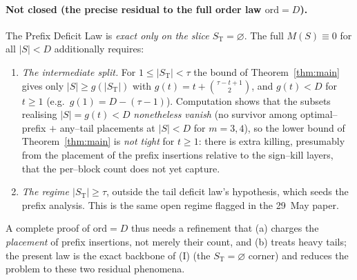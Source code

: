 \documentclass[11pt]{article}
\theoremstyle{definition}
\newcommand{\St}{S_{\mathrm T}}
\begin{document}
\paragraph{Not closed (the precise residual to the full order law $\mathrm{ord}=D$).}
The Prefix Deficit Law is \emph{exact only on the slice $\St=\varnothing$}. The full
$M(S)\equiv0$ for all $|S|<D$ additionally requires:
\begin{enumerate}[topsep=0.2em,itemsep=0.1em,label=\textup{(\Roman*)}]
\item \emph{The intermediate split.} For $1\le|\St|<\tau$ the bound of
Theorem~\ref{thm:main} gives only $|S|\ge g(|\St|)$ with
$g(t)=t+\binom{\tau-t+1}{2}$, and $g(t)<D$ for $t\ge1$ (e.g.\ $g(1)=D-(\tau-1)$). Computation
shows that the subsets realising $|S|=g(t)<D$ \emph{nonetheless vanish} (no survivor among
optimal--prefix $+$ any--tail placements at $|S|<D$ for $m=3,4$), so the lower bound of
Theorem~\ref{thm:main} is \emph{not tight} for $t\ge1$: there is extra killing, presumably from
the placement of the prefix insertions relative to the sign--kill layers, that the per--block
count does not yet capture.
\item \emph{The regime $|\St|\ge\tau$}, outside the tail deficit law's hypothesis, which seeds
the prefix analysis. This is the same open regime flagged in the 29~May paper.
\end{enumerate}
A complete proof of $\mathrm{ord}=D$ thus needs a refinement that (a) charges the
\emph{placement} of prefix insertions, not merely their count, and (b) treats heavy tails; the
present law is the exact backbone of (I) (the $\St=\varnothing$ corner) and reduces the problem
to these two residual phenomena.
\end{document}

